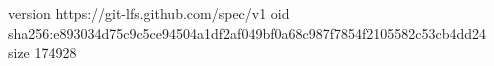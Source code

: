 version https://git-lfs.github.com/spec/v1
oid sha256:e893034d75c9c5ce94504a1df2af049bf0a68c987f7854f2105582c53cb4dd24
size 174928
